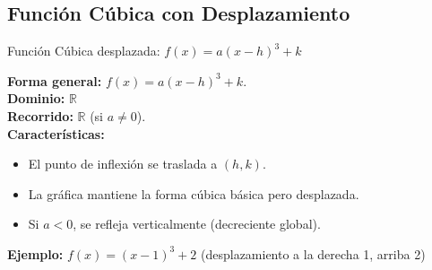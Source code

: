 \documentclass[12pt,a4paper]{article}
\begin{document}
\subsection{Función Cúbica con Desplazamiento}
\begin{funcbox}{Función Cúbica desplazada: $f(x)=a(x-h)^3+k$}
\begin{minipage}[t]{0.55\textwidth}
    \textbf{Forma general:} $f(x)=a(x-h)^3+k$.\\
    \textbf{Dominio:} $\mathbb{R}$\\
    \textbf{Recorrido:} $\mathbb{R}$ (si $a\neq 0$).\\
    \textbf{Características:}
    \begin{itemize}
        \item El punto de inflexión se traslada a $(h,k)$.
        \item La gráfica mantiene la forma cúbica básica pero desplazada.
        \item Si $a<0$, se refleja verticalmente (decreciente global).
    \end{itemize}
    \textbf{Ejemplo:} $f(x)=(x-1)^3+2$ (desplazamiento a la derecha 1, arriba 2)
\end{minipage}\hfill
\begin{minipage}[t]{0.4\textwidth}
    \centering
\end{minipage}
\end{funcbox}

\end{document}
